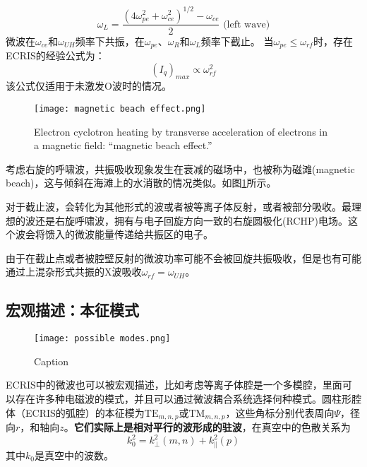 \documentclass{article}
\begin{document}
\begin{enumerate}
\begin{enumerate}
\begin{equation}
        \end{equation}
        \begin{equation}
            \omega_L=\frac{(4\omega_{pe}^2+\omega_{ce}^2)^{1/2}-\omega_{ce}}{2}\text{  (left wave)}
        \end{equation}
        微波在$\omega_{ce}$和$\omega_{UH}$频率下共振，在$\omega_{pe}$、$\omega_{R}$和$\omega_{L}$频率下截止。
        当$\omega_{pe}\le\omega_{rf}$时，存在ECRIS的经验公式为：
        \begin{equation}
            (I_q)_{max}\propto\omega_{rf}^2
        \end{equation}
        该公式仅适用于未激发O波时的情况。
    \end{enumerate}
\end{enumerate}
\begin{figure}[h]
    \centering
    \texttt{[image: magnetic beach effect.png]}
    \caption{Electron cyclotron heating by transverse acceleration of electrons in a magnetic field: “magnetic beach effect.”}
    \label{f-1}
\end{figure}

考虑右旋的呼啸波，共振吸收现象发生在衰减的磁场中，也被称为磁滩(magnetic beach)，这与倾斜在海滩上的水消散的情况类似。如图\ref{f-1}所示。

对于截止波，会转化为其他形式的波或者被等离子体反射，或者被部分吸收。最理想的波还是右旋呼啸波，拥有与电子回旋方向一致的右旋圆极化(RCHP)电场。这个波会将馈入的微波能量传递给共振区的电子。

由于在截止点或者被腔壁反射的微波功率可能不会被回旋共振吸收，但是也有可能通过上混杂形式共振的X波吸收$\omega_{rf}=\omega_{UH}$。

\subsection{宏观描述：本征模式}
\begin{figure}[h]
    \centering
    \texttt{[image: possible modes.png]}
    \caption{Caption}
    \label{f-2}
\end{figure}
ECRIS中的微波也可以被宏观描述，比如考虑等离子体腔是一个多模腔，里面可以存在许多种电磁波的模式，并且可以通过微波耦合系统选择何种模式。圆柱形腔体（ECRIS的弧腔）的本征模为$\text{TE}_{m,n,p}$或$\text{TM}_{m,n,p}$，这些角标分别代表周向$\Psi$，径向$r$，和轴向$z$。\textbf{它们实际上是相对平行的波形成的驻波}，在真空中的色散关系为
\begin{equation}
    k_0^2=k_\perp^2(m,n)+k_\parallel^2(p)
\end{equation}
其中$k_0$是真空中的波数。
\end{document}
